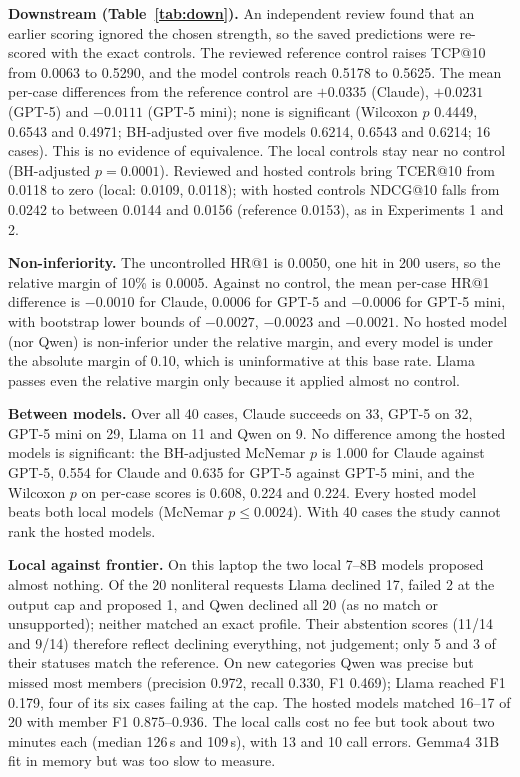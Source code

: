 \documentclass[conference]{IEEEtran}
\begin{document}
\textbf{Downstream (Table~\ref{tab:down}).} An independent review found that an earlier scoring ignored the chosen strength, so the saved predictions were re-scored with the exact controls. The reviewed reference control raises TCP@10 from 0.0063 to 0.5290, and the model controls reach 0.5178 to 0.5625. The mean per-case differences from the reference control are $+0.0335$ (Claude), $+0.0231$ (GPT-5) and $-0.0111$ (GPT-5 mini); none is significant (Wilcoxon $p$ 0.4449, 0.6543 and 0.4971; BH-adjusted over five models 0.6214, 0.6543 and 0.6214; 16 cases). This is no evidence of equivalence. The local controls stay near no control (BH-adjusted $p=0.0001$). Reviewed and hosted controls bring TCER@10 from 0.0118 to zero (local: 0.0109, 0.0118); with hosted controls NDCG@10 falls from 0.0242 to between 0.0144 and 0.0156 (reference 0.0153), as in Experiments 1 and 2.

\textbf{Non-inferiority.} The uncontrolled HR@1 is 0.0050, one hit in 200 users, so the relative margin of 10\% is 0.0005. Against no control, the mean per-case HR@1 difference is $-0.0010$ for Claude, $0.0006$ for GPT-5 and $-0.0006$ for GPT-5 mini, with bootstrap lower bounds of $-0.0027$, $-0.0023$ and $-0.0021$. No hosted model (nor Qwen) is non-inferior under the relative margin, and every model is under the absolute margin of 0.10, which is uninformative at this base rate. Llama passes even the relative margin only because it applied almost no control.

\textbf{Between models.} Over all 40 cases, Claude succeeds on 33, GPT-5 on 32, GPT-5 mini on 29, Llama on 11 and Qwen on 9. No difference among the hosted models is significant: the BH-adjusted McNemar $p$ is 1.000 for Claude against GPT-5, 0.554 for Claude and 0.635 for GPT-5 against GPT-5 mini, and the Wilcoxon $p$ on per-case scores is 0.608, 0.224 and 0.224. Every hosted model beats both local models (McNemar $p\leq0.0024$). With 40 cases the study cannot rank the hosted models.

\textbf{Local against frontier.} On this laptop the two local 7--8B models proposed almost nothing. Of the 20 nonliteral requests Llama declined 17, failed 2 at the output cap and proposed 1, and Qwen declined all 20 (as no match or unsupported); neither matched an exact profile. Their abstention scores (11/14 and 9/14) therefore reflect declining everything, not judgement; only 5 and 3 of their statuses match the reference. On new categories Qwen was precise but missed most members (precision 0.972, recall 0.330, F1 0.469); Llama reached F1 0.179, four of its six cases failing at the cap. The hosted models matched 16--17 of 20 with member F1 0.875--0.936. The local calls cost no fee but took about two minutes each (median 126\,s and 109\,s), with 13 and 10 call errors. Gemma4 31B fit in memory but was too slow to measure.
\end{document}
